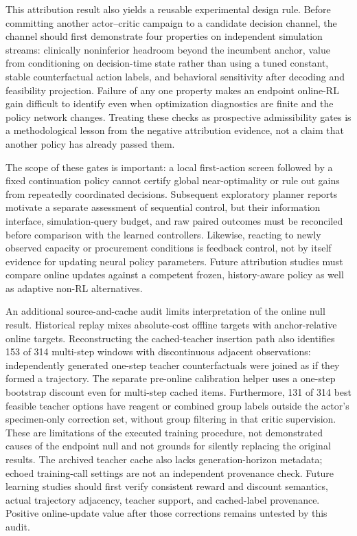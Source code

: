 \documentclass[preprint,review,12pt]{elsarticle}
\begin{document}
This attribution result also yields a reusable experimental design rule. Before
committing another actor--critic campaign to a candidate decision channel, the
channel should first demonstrate four properties on independent simulation
streams: clinically noninferior headroom beyond the incumbent anchor, value
from conditioning on decision-time state rather than using a tuned constant,
stable counterfactual action labels, and behavioral sensitivity after decoding
and feasibility projection. Failure of any one property makes an endpoint
online-RL gain difficult to identify even when optimization diagnostics are
finite and the policy network changes. Treating these checks as prospective
admissibility gates is a methodological lesson from the negative attribution
evidence, not a claim that another policy has already passed them.

The scope of these gates is important: a local first-action screen followed
by a fixed continuation policy cannot certify global near-optimality or rule
out gains from repeatedly coordinated decisions. Subsequent exploratory
planner reports motivate a separate assessment of sequential control, but
their information interface, simulation-query budget, and raw paired outcomes
must be reconciled before comparison with the learned controllers. Likewise,
reacting to newly observed capacity or procurement conditions is feedback
control, not by itself evidence for updating neural policy parameters. Future
attribution studies must compare online updates against a competent frozen,
history-aware policy as well as adaptive non-RL alternatives.

An additional source-and-cache audit limits interpretation of the online
null result. Historical replay mixes absolute-cost offline targets with
anchor-relative online targets. Reconstructing the cached-teacher insertion
path also identifies 153 of 314 multi-step windows with discontinuous adjacent
observations: independently generated one-step teacher counterfactuals were
joined as if they formed a trajectory. The separate pre-online calibration
helper uses a one-step bootstrap discount even for multi-step cached items.
Furthermore, 131 of 314 best feasible teacher options have reagent or combined
group labels outside the actor's specimen-only correction set, without group
filtering in that critic supervision. These are limitations of the executed
training procedure, not demonstrated causes of the endpoint null and not
grounds for silently replacing the original results. The archived teacher
cache also lacks generation-horizon metadata; echoed training-call settings
are not an independent provenance check. Future learning studies should first
verify consistent reward and discount semantics, actual trajectory adjacency,
teacher support, and cached-label provenance. Positive online-update value
after those corrections remains untested by this audit.
\end{document}
